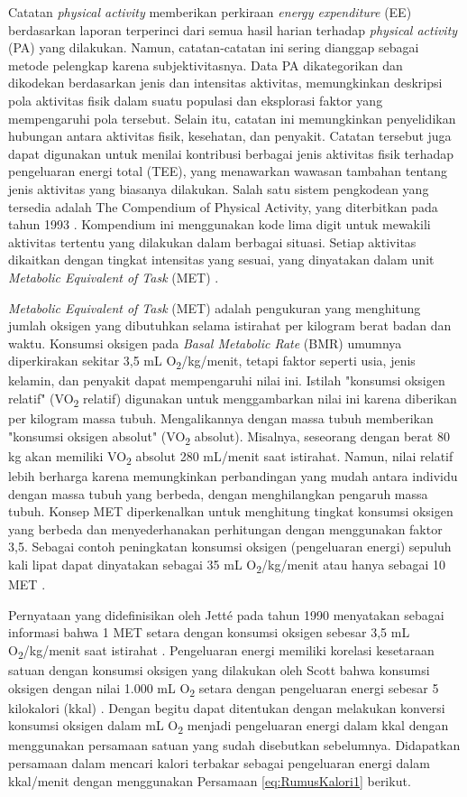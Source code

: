 Catatan \emph{physical activity} memberikan perkiraan \emph{energy expenditure} (EE) berdasarkan laporan terperinci dari semua hasil harian terhadap \emph{physical activity} (PA) yang dilakukan. Namun, catatan-catatan ini sering dianggap sebagai metode pelengkap karena subjektivitasnya. Data PA dikategorikan dan dikodekan berdasarkan jenis dan intensitas aktivitas, memungkinkan deskripsi pola aktivitas fisik dalam suatu populasi dan eksplorasi faktor yang mempengaruhi pola tersebut. Selain itu, catatan ini memungkinkan penyelidikan hubungan antara aktivitas fisik, kesehatan, dan penyakit. Catatan tersebut juga dapat digunakan untuk menilai kontribusi berbagai jenis aktivitas fisik terhadap pengeluaran energi total (TEE), yang menawarkan wawasan tambahan tentang jenis aktivitas yang biasanya dilakukan. Salah satu sistem pengkodean yang tersedia adalah The Compendium of Physical Activity, yang diterbitkan pada tahun 1993 \parencite{Ainsworth}. Kompendium ini menggunakan kode lima digit untuk mewakili aktivitas tertentu yang dilakukan dalam berbagai situasi. Setiap aktivitas dikaitkan dengan tingkat intensitas yang sesuai, yang dinyatakan dalam unit \emph{Metabolic Equivalent of Task} (MET) \parencite{Pinheiro}.

\emph{Metabolic Equivalent of Task} (MET) adalah pengukuran yang menghitung jumlah oksigen yang dibutuhkan selama istirahat per kilogram berat badan dan waktu. Konsumsi oksigen pada \emph{Basal Metabolic Rate} (BMR) umumnya diperkirakan sekitar 3,5 mL O\textsubscript{2}/kg/menit, tetapi faktor seperti usia, jenis kelamin, dan penyakit dapat mempengaruhi nilai ini. Istilah "konsumsi oksigen relatif" (VO\textsubscript{2} relatif) digunakan untuk menggambarkan nilai ini karena diberikan per kilogram massa tubuh. Mengalikannya dengan massa tubuh memberikan "konsumsi oksigen absolut" (VO\textsubscript{2} absolut). Misalnya, seseorang dengan berat 80 kg akan memiliki VO\textsubscript{2} absolut 280 mL/menit saat istirahat. Namun, nilai relatif lebih berharga karena memungkinkan perbandingan yang mudah antara individu dengan massa tubuh yang berbeda, dengan menghilangkan pengaruh massa tubuh. Konsep MET diperkenalkan untuk menghitung tingkat konsumsi oksigen yang berbeda dan menyederhanakan perhitungan dengan menggunakan faktor 3,5. Sebagai contoh peningkatan konsumsi oksigen (pengeluaran energi) sepuluh kali lipat dapat dinyatakan sebagai 35 mL O\textsubscript{2}/kg/menit atau hanya sebagai 10 MET \parencite{Steinach}.

Pernyataan yang didefinisikan oleh Jetté pada tahun 1990 menyatakan sebagai informasi bahwa 1 MET setara dengan konsumsi oksigen sebesar 3,5 mL O\textsubscript{2}/kg/menit saat istirahat \parencite{Jetté}. Pengeluaran energi memiliki korelasi kesetaraan satuan dengan konsumsi oksigen yang dilakukan oleh Scott bahwa konsumsi oksigen dengan nilai 1.000 mL O\textsubscript{2} setara dengan pengeluaran energi sebesar 5 kilokalori (kkal)  . Dengan begitu dapat ditentukan dengan melakukan konversi konsumsi oksigen dalam mL O\textsubscript{2} menjadi pengeluaran energi dalam kkal dengan menggunakan persamaan satuan yang sudah disebutkan sebelumnya. Didapatkan persamaan dalam mencari kalori terbakar sebagai pengeluaran energi dalam kkal/menit dengan menggunakan Persamaan \ref{eq:RumusKalori1} berikut.

